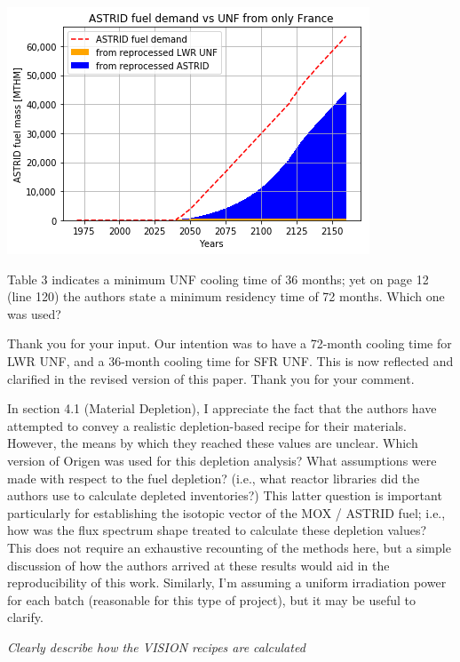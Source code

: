 \documentclass[answers,11pt]{exam}
\begin{document}
\begin{questions}
\begin{solution}
                \includegraphics{../images/french-transition/france_only_compare.png}
        \end{solution}

        \question Table 3 indicates a minimum UNF cooling time of 36 months; 
        yet on page 12 (line 120) the authors state a minimum residency time of 
        72 months. Which one was used?

        \begin{solution}
        	Thank you for your input. Our intention was to have a 72-month
        	cooling time for LWR UNF, and a 36-month cooling time for SFR UNF.
        	This is now reflected and clarified in the revised version of
        	this paper. Thank you for your comment.
        \end{solution}

        \question In section 4.1 (Material Depletion), I appreciate the fact 
        that the authors have attempted to convey a realistic depletion-based 
        recipe for their materials. However, the means by which they reached 
        these values are unclear. Which version of Origen was used for this 
        depletion analysis? What assumptions were made with respect to the fuel 
        depletion? (i.e., what reactor libraries did the authors use to 
        calculate depleted inventories?) This latter question is important 
        particularly for establishing the isotopic vector of the MOX / ASTRID 
        fuel; i.e., how was the flux spectrum shape treated to calculate these 
        depletion values? This does not require an exhaustive recounting of the 
        methods here, but a simple discussion of how the authors arrived at 
        these results would aid in the reproducibility of this work. Similarly, 
        I'm assuming a uniform irradiation power for each batch (reasonable for 
        this type of project), but it may be useful to clarify. 
        \begin{solution}
                \textit{Clearly describe how the VISION recipes are calculated}
        \end{solution}


\end{questions}
\end{document}
